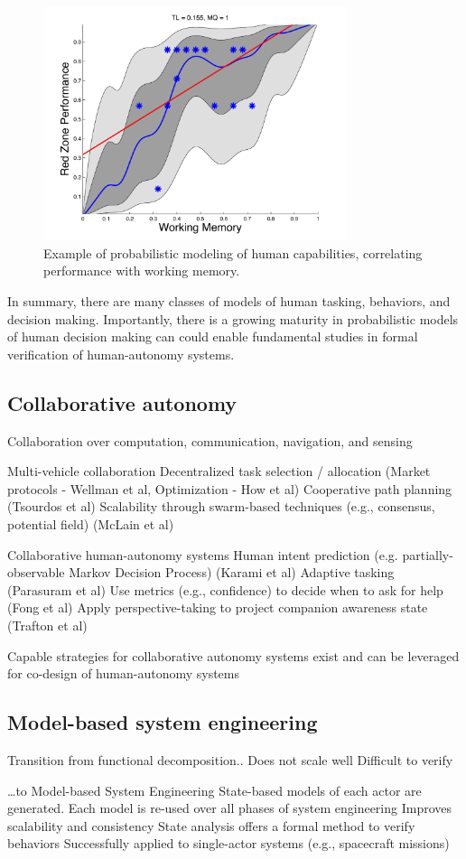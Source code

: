 \begin{figure}[h] 
   \centering
   \includegraphics[width=3.5in]{GP-fig.pdf} 
   \caption{Example of probabilistic modeling of human capabilities, correlating performance with working memory.}
   \label{fig:prob-humans}
\end{figure}

In summary, there are many classes of models of human tasking, behaviors, and decision making. Importantly, there is a growing maturity in probabilistic models of human decision making can could enable fundamental studies in formal verification of human-autonomy systems. 


\subsection*{Collaborative autonomy}


Collaboration over computation, communication, navigation, and sensing

Multi-vehicle collaboration 
Decentralized task selection / allocation (Market protocols - Wellman et al, Optimization - How et al) 
Cooperative path planning (Tsourdos et al)
Scalability through swarm-based techniques (e.g., consensus, potential field)  (McLain et al)

Collaborative human-autonomy systems
Human intent prediction (e.g. partially-observable Markov Decision Process) (Karami et al)
Adaptive tasking (Parasuram et al)
Use metrics (e.g., confidence) to decide when to ask for help (Fong et al) 
Apply perspective-taking to project companion awareness state (Trafton et al)


Capable strategies for collaborative autonomy systems exist and can be 
leveraged for co-design of human-autonomy systems


\subsection*{Model-based system engineering}


Transition from functional decomposition..
Does not scale well
Difficult to verify


…to Model-based System Engineering 
State-based models of each actor are generated.
Each model is re-used over all phases of system engineering
Improves scalability and consistency
State analysis offers a formal method to verify behaviors
Successfully applied to single-actor systems (e.g., spacecraft missions)

